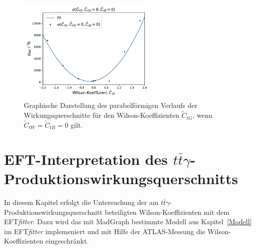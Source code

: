 \begin{figure}
  \centering
  \includegraphics[width=0.6\textwidth]{Plots/combi_plot_tG.pdf}
  \caption{Graphische Darstellung des parabelförmigen Verlaufs der Wirkungsquerschnitte für den Wilson-Koeffizienten $\tilde{C}_{tG}$, wenn $\tilde{C}_{tW}=\tilde{C}_{tB}=0$ gilt.}
  \label{fig:WtG}
\end{figure}
%
%
\chapter{EFT-Interpretation des \texorpdfstring {$t\bar{t}\gamma$}{math}-Produktionswirkungsquerschnitts}
In diesem Kapitel erfolgt die Untersuchung der am $t\bar{t}\gamma$-Produktionswirkungsquerschnitt beteiligten Wilson-Koeffizienten mit dem EFT\textit{fitter}. Dazu wird das mit MadGraph bestimmte Modell aus Kapitel~\ref{Modell} im EFT\textit{fitter} implemeniert und mit Hilfe der ATLAS-Messung die Wilson-Koeffizienten eingeschränkt.

